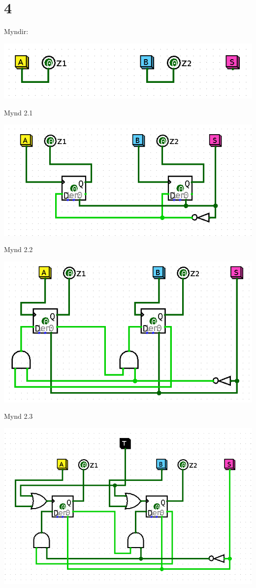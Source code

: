\documentclass{article}
\begin{document}
\section*{4}
Myndir:
\begin{center}
    \includegraphics[scale=0.5]{imgs/Screenshot from 2022-03-25 13-50-39.png}
\end{center}
Mynd 2.1
\begin{center}
    \includegraphics[scale=0.5]{imgs/Screenshot from 2022-03-25 13-57-08.png}
\end{center}
Mynd 2.2
\begin{center}
    \includegraphics[scale=0.5]{imgs/Screenshot from 2022-03-25 14-00-12.png}
\end{center}
Mynd 2.3
\begin{center}
    \includegraphics[scale=0.45]{imgs/Screenshot from 2022-03-25 13-00-00.png}
\end{center}
\end{document}
